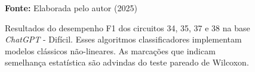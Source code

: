 \begin{figure}
\caption{Resultados do desempenho F1 dos circuitos 34, 35, 37 e 38 na base \textit{ChatGPT} - Difícil. Esses algoritmos classificadores implementam modelos clássicos não-lineares. As marcações que indicam semelhança estatística são advindas do teste pareado de Wilcoxon.}
\label{fig:f1:hard:g5}
     \centering
    \centering

      \par\medskip\ABNTEXfontereduzida\selectfont\textbf{Fonte:} Elaborada pelo autor (2025) \par\medskip
\end{figure}